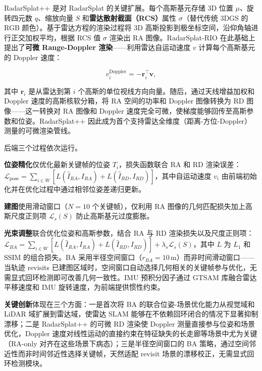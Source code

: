 RadarSplat++ 是对 RadarSplat 的关键扩展。每个高斯基元存储 3D 位置 $\mu$、旋转四元数 $q$、缩放向量 $S$ 和\textbf{雷达散射截面（RCS）}属性 $\sigma$（替代传统 3DGS 的 RGB 颜色）。基于雷达方程的渲染过程将 3D 高斯投影到极坐标空间，沿仰角轴进行正交加权平均，根据 RCS 值 $\sigma$ 渲染出 RA 图像。RadarSplat-RIO 在此基础上提出了\textbf{可微 Range-Doppler 渲染}——利用雷达自运动速度 $v$ 计算每个高斯基元的 Doppler 速度：

\begin{equation*}
v_i^{\text{Doppler}} = -\mathbf{r}_i^\top \mathbf{v},
\end{equation*}

其中 $\mathbf{r}_i$ 是从雷达到第 $i$ 个高斯的单位视线方向向量。随后，通过天线增益加权和 Doppler 速度的高斯核软分箱，将 RA 空间的功率和 Doppler 图像转换为 RD 图像——这一转换对 RA 图像和 Doppler 速度完全可微，使梯度能够回传至高斯参数和位姿。RadarSplat++ 因此成为首个支持雷达全维度（距离-方位-Doppler）测量的可微渲染管线。

后端三个过程依次运行。

\textbf{位姿精化}仅优化最新关键帧的位姿 $T_i$，损失函数联合 RA 和 RD 渲染误差：$\mathcal{L}_{\text{pose}} = \sum_{i \in W} \left[ L\!\left(\hat{I}_{RA}, I_{RA}\right) + L\!\left(\hat{I}_{RD}, I_{RD}\right) \right]$，其中自运动速度 $v_i$ 由前端初始化并在优化过程中通过相邻位姿差递归更新。

\textbf{建图}使用滑动窗口（$N=10$ 个关键帧），仅利用 RA 图像的几何匹配损失加上高斯尺度正则项 $\mathcal{L}_s(S)$ 防止高斯基元过度膨胀。

\textbf{光束调整}联合优化位姿和高斯参数，结合 RA 与 RD 渲染损失以及尺度正则项：$\mathcal{L}_{BA} = \sum_{i \in W} \left[ L\!\left(\hat{I}_{RA}, I_{RA}\right) + L\!\left(\hat{I}_{RD}, I_{RD}\right) \right] + \lambda_s \mathcal{L}_s(S)$，其中 $L$ 为 $L_1$ 和 SSIM 的组合损失。BA 采用半径空间窗口（$r_{BA} = 10$\,m）而非时间滑动窗口——当轨迹 revisits 已建图区域时，空间窗口自动选择几何相关的关键帧参与优化，无需显式回环检测即可改善几何一致性。IMU 预积分因子通过 GTSAM 库融合雷达平移速度和 IMU 旋转速度，为前端提供惯性约束。

\textbf{关键创新}体现在三个方面：一是首次将 BA 的联合位姿-场景优化能力从视觉域和 LiDAR 域扩展到雷达域，使雷达 SLAM 能够在不依赖回环闭合的情况下显著抑制漂移；二是 RadarSplat++ 的可微 RD 渲染使 Doppler 测量直接参与位姿和场景优化，Doppler 速度对线性运动的直接约束在特征缺失的长走廊等场景中尤为关键（RA-only 对齐在这些场景下病态）；三是半径空间窗口的 BA 策略，通过空间邻近性而非时间邻近性选择关键帧，天然适配 revisit 场景的漂移校正，无需显式回环检测模块。

